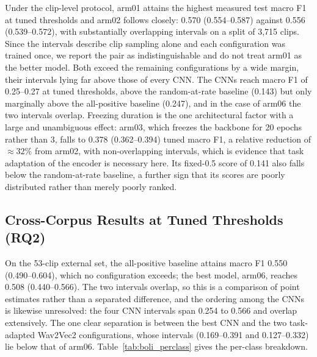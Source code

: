 \documentclass[a4paper,orivec]{llncs}
\begin{document}
Under the clip-level protocol, arm01 attains the highest measured test macro F1
at tuned thresholds and arm02 follows closely: 0.570 (0.554--0.587) against 0.556
(0.539--0.572), with substantially overlapping intervals on a split of 3{,}715
clips. Since the intervals describe clip sampling alone and each configuration
was trained once, we report the pair as indistinguishable and do not treat arm01
as the better model. Both exceed the remaining configurations by a wide margin,
their intervals lying far above those of every CNN. The CNNs reach macro F1 of
0.25--0.27 at tuned thresholds, above the random-at-rate baseline (0.143) but
only marginally above the all-positive baseline (0.247), and in the case of arm06
the two intervals overlap. Freezing duration is the one architectural factor with
a large and unambiguous effect: arm03, which freezes the backbone for 20 epochs
rather than 3, falls to 0.378 (0.362--0.394) tuned macro F1, a relative reduction
of ${\approx}32\%$ from arm02, with non-overlapping intervals, which is evidence
that task adaptation of the encoder is necessary here. Its fixed-0.5 score of 0.141
also falls below the random-at-rate baseline, a further sign that its scores are
poorly distributed rather than merely poorly ranked.

\subsection{Cross-Corpus Results at Tuned Thresholds (RQ2)}
\label{sec:res-boli-tuned}
On the 53-clip external set, the all-positive baseline attains macro F1 0.550
(0.490--0.604), which no configuration exceeds; the best model, arm06, reaches
0.508 (0.440--0.566). The two intervals overlap, so this is a comparison of point
estimates rather than a separated difference, and the ordering among the CNNs is
likewise unresolved: the four CNN intervals span 0.254 to 0.566 and overlap
extensively. The one clear separation is between the best CNN and the two
task-adapted Wav2Vec2 configurations, whose intervals (0.169--0.391 and
0.127--0.332) lie below that of arm06. Table~\ref{tab:boli_perclass} gives the
per-class breakdown.
\end{document}
